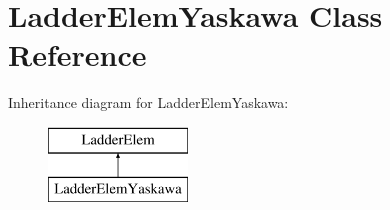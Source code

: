 \hypertarget{class_ladder_elem_yaskawa}{\section{Ladder\-Elem\-Yaskawa Class Reference}
\label{class_ladder_elem_yaskawa}
}
Inheritance diagram for Ladder\-Elem\-Yaskawa\-:\begin{figure}[H]
\begin{center}
\leavevmode
\includegraphics[height=2.000000cm]{class_ladder_elem_yaskawa}
\end{center}
\end{figure}
